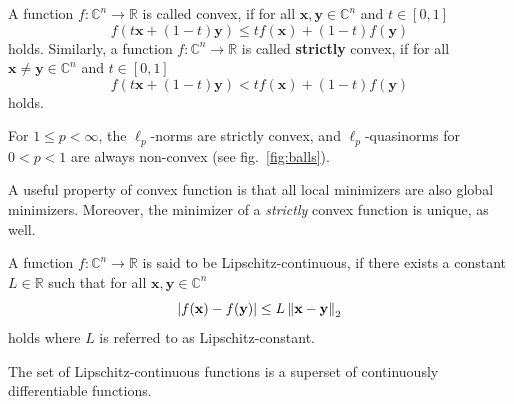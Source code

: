 \begin{tight_equations}
\begin{definition}
A function $f:\mathbb{C}^n \rightarrow \mathbb{R}$ is called convex, if for all $\mathbf{x}, \mathbf{y} \in \mathbb{C}^n $ and $t\in [0,1]$
\[f(t\mathbf{x} + (1-t)\mathbf{y}) \le t f(\mathbf{x}) + (1-t) f(\mathbf{y})\]
holds. Similarly, a function $f:\mathbb{C}^n  \rightarrow \mathbb{R}$ is called \textbf{strictly} convex, if for all $\mathbf{x} \ne \mathbf{y} \in \mathbb{C}^n $ and $t\in [0,1]$
\[f(t\mathbf{x} + (1-t)\mathbf{y}) < t f(\mathbf{x}) + (1-t) f(\mathbf{y})\]
holds.
\end{definition}

\begin{remark}
For $1 \le p < \infty$, the $\ell_p$-norms are strictly convex, and $\ell_p$-quasinorms for $0 < p < 1$ are always non-convex (see fig.~\ref{fig:balls}).
\end{remark}

\begin{remark}
A useful property of convex function is that all local minimizers are also global minimizers. Moreover, the minimizer of a \textit{strictly} convex function is unique, as well.
\end{remark}

\begin{definition}
A function $f:\mathbb{C}^n \rightarrow \mathbb{R}$ is said to be Lipschitz-continuous, if there exists a constant $L \in \mathbb{R}$ such that for all $\mathbf{x}, \mathbf{y} \in \mathbb{C}^n$
\[|f(\mathbf{x}) - f(\mathbf{y})| \le L \left\lVert\mathbf{x} - \mathbf{y}\right\rVert_2\]
holds where $L$ is referred to as Lipschitz-constant.
\end{definition}

\begin{remark}
The set of Lipschitz-continuous functions is a superset of continuously differentiable functions.
\end{remark}


\end{tight_equations}
